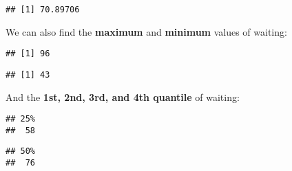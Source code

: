 \documentclass[
]{book}
\newenvironment{Shaded}{\begin{snugshade}}{\end{snugshade}}
\newcommand{\FloatTok}[1]{\textcolor[rgb]{0.00,0.00,0.81}{#1}}
\newcommand{\FunctionTok}[1]{\textcolor[rgb]{0.00,0.00,0.00}{#1}}
\newcommand{\NormalTok}[1]{#1}
\newcommand{\SpecialCharTok}[1]{\textcolor[rgb]{0.00,0.00,0.00}{#1}}
\begin{document}
\begin{verbatim}
## [1] 70.89706
\end{verbatim}

We can also find the \textbf{maximum} and \textbf{minimum} values of waiting:

\begin{Shaded}
\end{Shaded}

\begin{verbatim}
## [1] 96
\end{verbatim}

\begin{Shaded}
\end{Shaded}

\begin{verbatim}
## [1] 43
\end{verbatim}

And the \textbf{1st, 2nd, 3rd, and 4th quantile} of waiting:

\begin{Shaded}
\end{Shaded}

\begin{verbatim}
## 25%
##  58
\end{verbatim}

\begin{Shaded}
\end{Shaded}

\begin{verbatim}
## 50%
##  76
\end{verbatim}

\begin{Shaded}
\end{Shaded}
\end{document}
